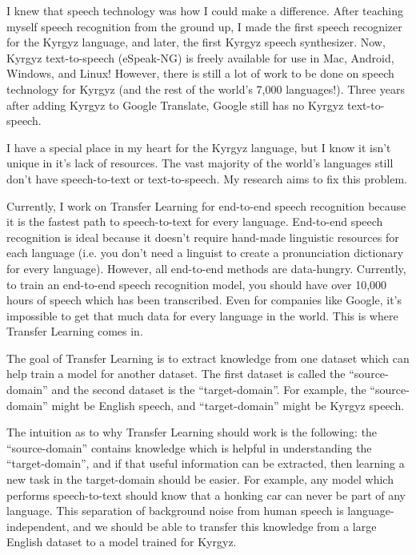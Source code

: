 \documentclass[12pt,a4paper]{article}
\begin{document}
I knew that speech technology was how I could make a difference. After teaching myself speech recognition from the ground up, I made the first speech recognizer for the Kyrgyz language, and later, the first Kyrgyz speech synthesizer. Now, Kyrgyz text-to-speech (eSpeak-NG) is freely available for use in Mac, Android, Windows, and Linux! However, there is still a lot of work to be done on speech technology for Kyrgyz (and the rest of the world's 7,000 languages!). Three years after adding Kyrgyz to Google Translate, Google still has no Kyrgyz text-to-speech.

I have a special place in my heart for the Kyrgyz language, but I know it isn't unique in it's lack of resources. The vast majority of the world's languages still don't have speech-to-text or text-to-speech. My research aims to fix this problem.

Currently, I work on Transfer Learning for end-to-end speech recognition because it is the fastest path to speech-to-text for every language. End-to-end speech recognition is ideal because it doesn't require hand-made linguistic resources for each language (i.e. you don't need a linguist to create a pronunciation dictionary for every language). However, all end-to-end methods are data-hungry. Currently, to train an end-to-end speech recognition model, you should have over 10,000 hours of speech which has been transcribed. Even for companies like Google, it's impossible to get that much data for every language in the world. This is where Transfer Learning comes in.

The goal of Transfer Learning is to extract knowledge from one dataset which can help train a model for another dataset. The first dataset is called the ``source-domain'' and the second dataset is the ``target-domain''. For example, the ``source-domain'' might be English speech, and ``target-domain'' might be Kyrgyz speech.

The intuition as to why Transfer Learning should work is the following: the ``source-domain'' contains knowledge which is helpful in understanding the ``target-domain'', and if that useful information can be extracted, then learning a new task in the target-domain should be easier. For example, any model which performs speech-to-text should know that a honking car can never be part of any language. This separation of background noise from human speech is language-independent, and we should be able to transfer this knowledge from a large English dataset to a model trained for Kyrgyz.
\end{document}
